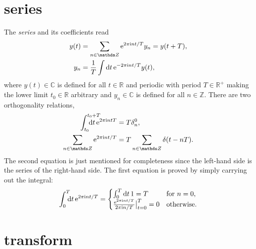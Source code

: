 \section{ series}

The \emph{ series} and its coefficients read
%
\begin{align*}
    y(t) &= \sum_{n \in \mathds Z} \E^{2 \pi \I n t / T} y_n = y(t + T), \\
    y_n &= \frac 1 T \int \D t \, \E^{-2 \pi \I n t / T} y(t),
\end{align*}
%
where $y(t) \in \mathds C$ is defined for all $t \in \mathds R$ and periodic
with period $T \in \mathds R^+$ making the lower limit $t_0 \in \mathds R$
arbitrary and $y_n \in \mathds C$ is defined for all $n \in \mathds Z$. There
are two orthogonality relations,
%
\begin{subequations}
    \begin{align}
        \label{Fourier series orthogonality relation}
        \int \from{t_0} \till{t_0 + T} \D t \, \E^{2 \pi \I n t T}
        &= T \delta_n^0,
        \\
        \label{Dirac comb}
        \sum_{n \in \mathds Z} \E^{2 \pi \I n t / T}
        &= T \sum_{n \in \mathds Z} \delta(t - n T).
    \end{align}
\end{subequations}
%
The second equation is just mentioned for completeness since the left-hand side
is the  series of the right-hand side. The first equation is
proved by simply carrying out the integral:
%
\begin{equation*}
    \int \from 0 \till T \D t \, \E^{2 \pi \I n t / T} =
    \begin{cases}
        \int_0^ T \D t \, 1 = T
            & \text{for $n = 0$,} \\
        \frac{\E^{2 \pi \I n t / T}}{2 \pi \I n / T} \big|_{t = 0}^T = 0
            & \text{otherwise.}
    \end{cases}
\end{equation*}

\section{ transform}

